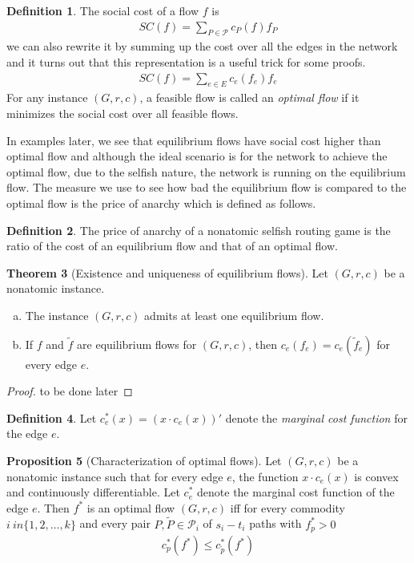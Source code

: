 \documentclass[a4paper,10pt]{article}
\theoremstyle{definition}
\newtheorem{thm}{Theorem}[section]
\newtheorem{prop}[thm]{Proposition}
\newtheorem{defn}[thm]{Definition}
\begin{document}
\begin{defn}
The social cost of a flow $f$ is
\begin{align*}
SC(f) = \sum_{P\in \mathcal{P}}c_P(f)f_P
\end{align*}
we can also rewrite it by summing up the cost over all the edges in the network and it turns out that this representation is a useful trick for some proofs.
\begin{align*}
SC(f) = \sum_{e\in E}c_e(f_e)f_e
\end{align*}
For any instance $(G,r,c)$, a feasible flow is called an \emph{optimal flow} if it minimizes the social cost over all feasible flows. 
\end{defn}

In examples later, we see that equilibrium flows have social cost higher than optimal flow and although the ideal scenario is for the network to achieve the optimal flow, due to the selfish nature, the network is running on the equilibrium flow. The measure we use to see how bad the equilibrium flow is compared to the optimal flow is the price of anarchy which is defined as follows.

\begin{defn}
The price of anarchy of a nonatomic selfish routing game is the ratio of the cost of an equilibrium flow and that of an optimal flow.
\end{defn}


\begin{thm}[Existence and uniqueness of equilibrium flows]
Let $(G,r,c)$ be a nonatomic instance.
\begin{enumerate}[(a)]
\item The instance $(G,r,c)$ admits at least one equilibrium flow.
\item If $f$ and $\tilde{f}$ are equilibrium flows for $(G,r,c)$, then $c_e(f_e)=c_e(\tilde{f}_e)$ for every edge $e$.
\end{enumerate}
\begin{proof}
to be done later
\end{proof}
\end{thm}

\begin{defn}
Let $c_e^\ast(x)=(x\cdot c_e(x))'$ denote the \emph{marginal cost function} for the edge $e$.
\end{defn}

\begin{prop}[Characterization of optimal flows]
Let $(G,r,c)$ be a nonatomic instance such that for every edge $e$, the function $x\cdot c_e(x)$ is convex and continuously differentiable. Let $c_e^\ast$ denote the marginal cost function of the edge $e$. Then $f^\ast$ is an optimal flow $(G,r,c)$ iff for every commodity $i\ in \{1,2,\ldots, k\}$ and every pair $P, \tilde{P} \in \mathcal{P}_i$ of $s_i-t_i$ paths with $f_p^\ast>0$
\begin{align*}
c_p^\ast(f^\ast) \leq c_{\tilde{p}}^\ast(f^\ast)
\end{align*}
\end{prop}
\end{document}
